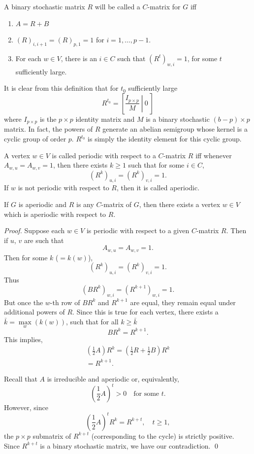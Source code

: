\begin{definition}          \label{defn:4.4}
A binary stochastic matrix $R$ will be called a $C$-matrix for $G$ iff
%
\begin{enumerate}
\item[(1)]  $A=R+B$

\item[(2)]  $\left( R\right) _{i,i+1}=\left( R\right) _{p,1}=1$ for $i=1,\dots,p-1$.

\item[(3)]   For each $w\in V$, there is an $i\in C$ such that
$\left( R^t\right) _{w,i}=1$, for some $t$ sufficiently large.
\end{enumerate}
%

It is clear from this definition that for $t_0$ sufficiently large
\[
  R^{t_0}=\left[ \left.\dfrac{I_{p\times p}}M\ \right|\  0\ \right] 
\]
where $I_{p\times p}$ is the $p\times p$ identity matrix and $M$ is a binary
stochastic $(b-p)\times p$ matrix. 
In fact, the powers of $R$ generate an abelian semigroup whose kernel is a cyclic group of order $p$. 
$R^{t_0}$ is simply the identity element for this cyclic group.
\end{definition}

\begin{definition}          \label{defn:4.5}
A vertex $w\in V$ is called periodic with respect to a $C$-matrix $R$ iff
whenever $A_{w,u}=A_{w,v}=1$, then there exists $k\ge 1$ such that for some $i\in C$,
\[
  \left( R^k\right) _{u,i}=\left( R^k\right) _{v,i}=1.
\]
If $w$ is not periodic with respect to $R$, then it is called aperiodic.
\end{definition}

\begin{theorem}		\label{thm:4.8}
If $G$ is aperiodic and $R$ is any $C$-matrix of $G$, then there exists a
vertex $w\in V$ which is aperiodic with respect to $R$.
\end{theorem}

\begin{proof}
Suppose each $w\in V$ is periodic with respect to a given $C$-matrix $R$.
Then if $u$, $v$ are such that
\[
  A_{w,u}=A_{w,v}=1.
\]
Then for some $k$ ($=k(w)$),
\[
  \left( R^k\right) _{u,i}=\left( R^k\right) _{v,i}=1.
\]
Thus
\[
  \left( BR^k\right) _{w,i}=\left( R^{k+1}\right) _{w,i}=1.
\]
But once the $w$-th row of $BR^k$ and $R^{k+1}$ are equal, they remain equal
under additional powers of $R$. 
Since this is true for each vertex, there exists a $\bar{k}=\max\limits_w(k(w))$, such that for all $k\ge\bar{k}$
\[
  BR^k=R^{k+1}.
\]
This implies,
\[
  \begin{gathered}
	\left( \frac12 A\right) R^k =\left( \frac12 R+\frac12 B\right) R^k \\
	=R^{k+1}.
  \end{gathered}
\]

Recall that $A$ is irreducible and aperiodic or, equivalently,
\[
  \left( \frac12 A\right) ^t>0\quad\text{for some }t.
\]
However, since
\[
  \left( \frac12 A\right) ^t R^k=R^{k+t},\quad t\ge 1,
\]
the $p\times p$ submatrix of $R^{k+t}$ (corresponding to the cycle) is
strictly positive. 
Since $R^{k+t}$ is a binary stochastic matrix, we have our contradiction.
\qed
\end{proof}

